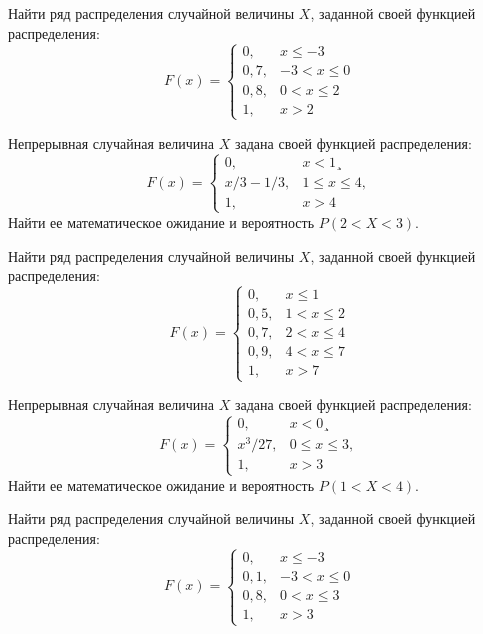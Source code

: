 \vfill

\newpage\setcounter{zad}{0}

\z Найти ряд распределения случайной величины $X$, заданной своей функцией распределения: $$ F(x) = \begin{cases}0, & x \leqslant -3 \\ 0{,}7, & -3 < x \leqslant 0 \\ 0{,}8, & 0 < x \leqslant 2 \\ 1, & x > 2 \end{cases} $$


\vfill

\z Непрерывная случайная величина $X$ задана своей функцией распределения: $$ F(x) = \begin{cases}0, & x < 1¸\\ x/3-1/3, & 1 \leqslant x \leqslant 4, \\ 1, & x > 4 \end{cases} $$ Найти ее математическое ожидание и вероятность $P(2 < X < 3)$.
 

\vfill

\newpage\setcounter{zad}{0}

\z Найти ряд распределения случайной величины $X$, заданной своей функцией распределения: $$ F(x) = \begin{cases}0, & x \leqslant 1 \\ 0{,}5, & 1 < x \leqslant 2 \\ 0{,}7, & 2 < x \leqslant 4 \\ 0{,}9, & 4 < x \leqslant 7 \\ 1, & x > 7 \end{cases} $$


\vfill

\z Непрерывная случайная величина $X$ задана своей функцией распределения: $$ F(x) = \begin{cases}0, & x < 0¸\\ x^3/27, & 0 \leqslant x \leqslant 3, \\ 1, & x > 3 \end{cases} $$ Найти ее математическое ожидание и вероятность $P(1 < X < 4)$.
 

\vfill

\newpage\setcounter{zad}{0}

\z Найти ряд распределения случайной величины $X$, заданной своей функцией распределения: $$ F(x) = \begin{cases}0, & x \leqslant -3 \\ 0{,}1, & -3 < x \leqslant 0 \\ 0{,}8, & 0 < x \leqslant 3 \\ 1, & x > 3 \end{cases} $$


